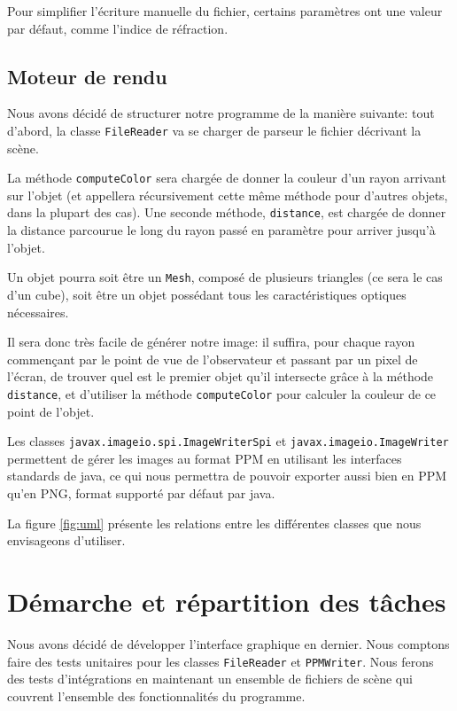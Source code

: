 \documentclass[a4paper]{article}
\begin{document}
    Pour simplifier l'écriture manuelle du fichier,
    certains paramètres ont une valeur par défaut, comme l'indice de réfraction.

  \subsection{Moteur de rendu}
    Nous avons décidé de structurer notre programme de la manière suivante:
    tout d'abord, la classe \verb+FileReader+ va se charger de parseur le
    fichier décrivant la scène.

    La méthode \verb+computeColor+ sera chargée de donner la couleur d'un rayon
    arrivant sur l'objet (et appellera récursivement cette même méthode pour
    d'autres objets, dans la plupart des cas).
    Une seconde méthode, \verb+distance+, est chargée de donner la distance
    parcourue le long du rayon passé en paramètre pour arriver jusqu'à l'objet.

    Un objet pourra soit être un \verb+Mesh+, composé de plusieurs triangles
    (ce sera le cas d'un cube), soit être un objet possédant tous les
    caractéristiques optiques nécessaires.

    Il sera donc très facile de générer notre image: il suffira, pour chaque
    rayon commençant par le point de vue de l'observateur et passant par un
    pixel de l'écran, de trouver quel est le premier objet qu'il intersecte
    grâce à la méthode \verb+distance+, et d'utiliser la méthode
    \verb+computeColor+ pour calculer la couleur de ce point de l'objet.

    Les classes \verb+javax.imageio.spi.ImageWriterSpi+ et 
    \verb+javax.imageio.ImageWriter+ permettent de gérer les images au format
    PPM en utilisant les interfaces standards de java, ce qui nous permettra
    de pouvoir exporter aussi bien en PPM qu'en PNG, format supporté par défaut
    par java.

    La figure \ref{fig:uml} présente les relations entre les différentes classes
    que nous envisageons d'utiliser.

\section{Démarche et répartition des tâches} 
  Nous avons décidé de développer l'interface graphique en dernier. Nous 
  comptons faire des tests unitaires pour les classes
  \verb+FileReader+ et \verb+PPMWriter+. Nous ferons des tests d'intégrations
  en maintenant un ensemble de fichiers de scène qui couvrent l'ensemble des
  fonctionnalités du programme.
\end{document}
